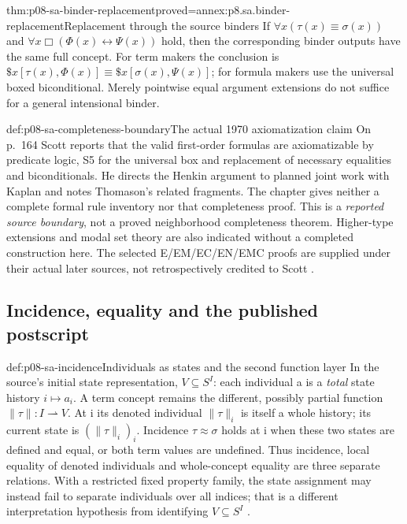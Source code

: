 \begin{hbtheorem}{thm:p08-sa-binder-replacement}{proved=annex:p8.sa.binder-replacement}{Replacement through the source binders}
If \(\forall x(\tau(x)\equiv\sigma(x))\) and
\(\forall x\Box(\Phi(x)\leftrightarrow\Psi(x))\) hold,
then the corresponding binder outputs have the same full concept.
For term makers the conclusion is
\(\$x[\tau(x),\Phi(x)]\equiv\$x[\sigma(x),\Psi(x)]\);
for formula makers use the universal boxed biconditional.
Merely pointwise equal argument extensions do not suffice for a general
intensional binder.
\end{hbtheorem}

\begin{proofboundary}{def:p08-sa-completeness-boundary}{The actual 1970 axiomatization claim}
On p.~164 Scott reports that the valid first-order formulas are
axiomatizable by predicate logic, S5 for the universal box and replacement
of necessary equalities and biconditionals. He directs the Henkin argument
to planned joint work with Kaplan and notes Thomason's related fragments.
The chapter gives neither a complete formal rule inventory nor that
completeness proof. This is a \emph{reported source boundary}, not a
proved neighborhood completeness theorem. Higher-type extensions and
modal set theory are also indicated without a completed construction here.
The selected E/EM/EC/EN/EMC proofs are supplied under their actual later
sources, not retrospectively credited to Scott \cite[pp.~164--165]{Scott1970}.
\end{proofboundary}

\subsection{Incidence, equality and the published postscript}

\begin{hbdefinition}{def:p08-sa-incidence}{Individuals as states and the second function layer}
In the source's initial state representation, \(V\subseteq S^I\):
each individual a is a \emph{total} state history \(i\mapsto a_i\).
A term concept remains the different, possibly partial function
\(\|\tau\|:I\rightharpoonup V\). At i its denoted individual
\(\|\tau\|_i\) is itself a whole history; its current state is
\((\|\tau\|_i)_i\). Incidence \(\tau\approx\sigma\) holds
at i when these two states are defined and equal, or both term
values are undefined. Thus incidence, local equality of denoted
individuals and whole-concept equality are three separate relations.
With a restricted fixed property family, the state assignment may
instead fail to separate individuals over all indices; that is a
different interpretation hypothesis from identifying \(V\subseteq S^I\)
\cite[\S VI, pp.~165--169]{Scott1970}.
\end{hbdefinition}

